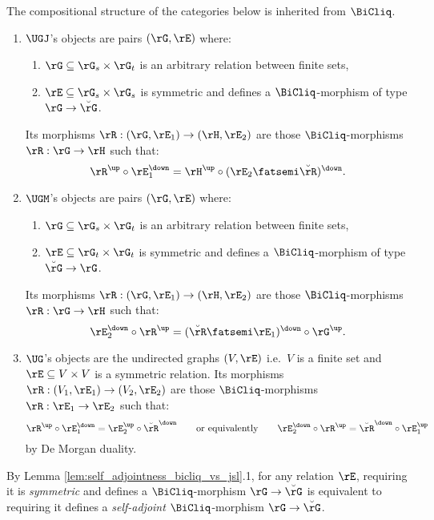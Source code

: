 \documentclass{article}
\begin{document}
\begin{definition}
\label{def:ulg_j_m}
\item
The compositional structure of the categories below is inherited from $\BiCliq$.

\begin{enumerate}
\item
$\UGJ$'s objects are pairs $(\rG,\rE)$ where:
\begin{enumerate}
\item
$\rG \subseteq \rG_s \times \rG_t$ is an arbitrary relation between finite sets,
\item
$\rE \subseteq \rG_s \times \rG_s$ is symmetric and defines a $\BiCliq$-morphism of type $\rG \to \breve{\rG}$.
\end{enumerate}
Its morphisms $\rR : (\rG,\rE_1) \to (\rH,\rE_2)$ are those $\BiCliq$-morphisms $\rR : \rG \to \rH$ such that:
\[
\rR^\up \circ \rE_1^\down = \rH^\up \circ (\rE_2 \fatsemi \breve{\rR})^\down.
\]

\item
$\UGM$'s objects are pairs $(\rG,\rE)$ where:
\begin{enumerate}
\item
$\rG \subseteq \rG_s \times \rG_t$ is an arbitrary relation between finite sets,
\item
$\rE \subseteq \rG_t \times \rG_t$ is symmetric and defines a $\BiCliq$-morphism of type $\breve{\rG} \to \rG$.
\end{enumerate}
Its morphisms $\rR : (\rG,\rE_1) \to (\rH,\rE_2)$ are those $\BiCliq$-morphisms $\rR : \rG \to \rH$ such that:
\[
\rE_2^\down \circ \rR^\up
= (\breve{\rR} \fatsemi \rE_1)^\down \circ \rG^\up.
\]

\item
$\UG$'s objects are the undirected graphs $(V,\rE)$ i.e.\ $V$ is a finite set and $\rE \subseteq V \times V$ is a symmetric relation. Its morphisms $\rR : (V_1,\rE_1) \to (V_2,\rE_2)$ are those $\BiCliq$-morphisms $\rR : \rE_1 \to \rE_2$ such that:
\[
\rR^\up \circ \rE_1^\down = \rE_2^\up \circ \breve{\rR}^\down
\qquad \text{or equivalently} \qquad
\rE_2^\down \circ \rR^\up = \breve{\rR}^\down \circ \rE_1^\up
\]
by De Morgan duality. \endbox
\end{enumerate}

\end{definition}

\smallskip

\begin{note}
  By Lemma \ref{lem:self_adjointness_bicliq_vs_jsl}.1, for any relation $\rE$, requiring it is \emph{symmetric} and defines a $\BiCliq$-morphism $\rG \to \breve{\rG}$ is equivalent to requiring it defines a \emph{self-adjoint} $\BiCliq$-morphism $\rG \to \breve{\rG}$. \endbox
\end{note}
\end{document}
